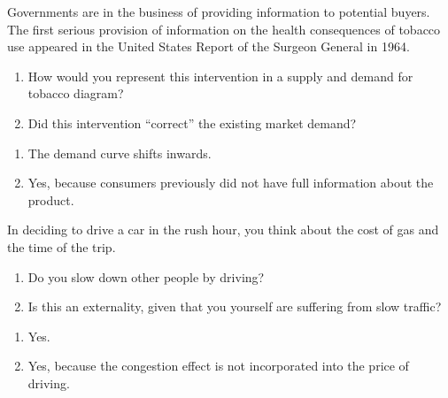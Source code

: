 \begin{enumialphparenastyle}
\begin{econex}\label{ex:ch5ex4}
Governments are in the business of providing information to potential buyers. The first serious provision of information on the health consequences of tobacco use appeared in the United States Report of the Surgeon General in 1964.
\begin{enumerate}
\item	How would you represent this intervention in a supply and demand for tobacco diagram?
\item	Did this intervention ``correct'' the existing market demand?
\end{enumerate}
\begin{econsolution}
\begin{enumerate}
\item	The demand curve shifts inwards.
\item	Yes, because consumers previously did not have full information about the product.
\end{enumerate}
\end{econsolution}
\end{econex}

\begin{econex}\label{ex:ch5ex5}
In deciding to drive a car in the rush hour, you think about the cost of gas and the time of the trip.
\begin{enumerate}
\item	Do you slow down other people by driving?
\item	Is this an externality, given that you yourself are suffering from slow traffic?
\end{enumerate}
\begin{econsolution}
\begin{enumerate}
\item	Yes.
\item	Yes, because the congestion effect is not incorporated into the price of driving.
\end{enumerate}
\end{econsolution}
\end{econex}


\end{enumialphparenastyle}

